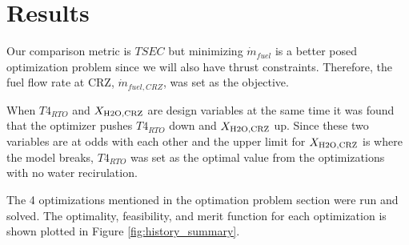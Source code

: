 \documentclass[conf]{new-aiaa}
\begin{document}

\section{Results}
\label{sec:results}

Our comparison metric is $TSEC$ but minimizing $\dot{m}_{fuel}$ is a better posed optimization problem since we will also have thrust constraints.
Therefore, the fuel flow rate at CRZ, $\dot{m}_{fuel,CRZ}$, was set as the objective.

When $T4_{RTO}$ and $X_{\rm{H2O,CRZ}}$ are design variables at the same time it was found that the optimizer pushes $T4_{RTO}$ down and $X_{\rm{H2O,CRZ}}$ up.
Since these two variables are at odds with each other and the upper limit for $X_{\rm{H2O,CRZ}}$ is where the model breaks, $T4_{RTO}$ was set as the optimal value from the optimizations with no water recirulation.

The 4 optimizations mentioned in the optimation problem section were run and solved.
The optimality, feasibility, and merit function for each optimization is shown plotted in Figure \ref{fig:history_summary}.
\end{document}
